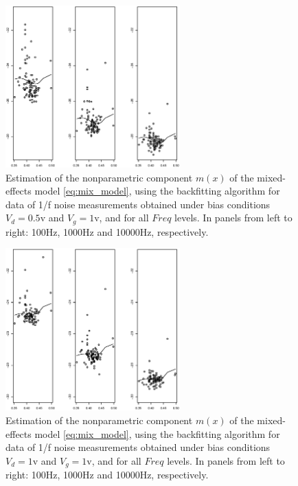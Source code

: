 \documentclass[sn-mathphys]{sn-jnl}%
\theoremstyle{thmstyleone}%
\theoremstyle{thmstyletwo}%
\theoremstyle{thmstylethree}%
\begin{document}
\begin{figure}[ht]
	\centerline{\includegraphics [width=0.6\textwidth]{Fig10_elognoise_d05g1.eps}}%
	\caption{Estimation of the nonparametric component $m(x)$ of the mixed-effects model \eqref{eq:mix_model}, using the backfitting algorithm for data of 1/f noise measurements obtained under bias conditions $V_d=0.5$v and $V_g=1$v, and for all $Freq$ levels. In panels from left to right: 100Hz, 1000Hz and 10000Hz, respectively.}
	\label{fig:backfit3}
\end{figure}
\begin{figure}[ht]
	\centerline{\includegraphics [width=0.6\textwidth]{Fig11_elognoise_d1g1.eps}}%
	\caption{Estimation of the nonparametric component $m(x)$ of the mixed-effects model \eqref{eq:mix_model}, using the backfitting algorithm for data of 1/f noise measurements obtained under bias conditions $V_d=1$v and $V_g=1$v, and for all $Freq$ levels. In panels from left to right: 100Hz, 1000Hz and 10000Hz, respectively.}
	\label{fig:backfit4}
\end{figure}

\end{document}
